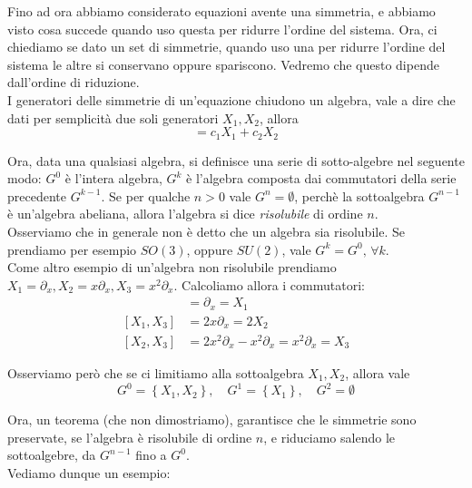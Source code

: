 \documentclass{report}
\begin{document}
Fino ad ora abbiamo considerato equazioni avente una simmetria, e abbiamo visto cosa succede quando uso questa per ridurre l'ordine del sistema. Ora, ci chiediamo se dato un set di simmetrie, quando uso una per ridurre l'ordine del sistema le altre si conservano oppure spariscono. Vedremo che questo dipende dall'ordine di riduzione. \\

I generatori delle simmetrie di un'equazione chiudono un algebra, vale a dire che dati per semplicità due soli generatori $X_1, X_2$, allora
\begin{equation}
    [X_1, X_2] = c_1X_1 + c_2 X_2
\end{equation}

Ora, data una qualsiasi algebra, si definisce una serie di sotto-algebre nel seguente modo: $G^{0}$ è l'intera algebra, $G^k$ è l'algebra composta dai commutatori della serie precedente $G^{k-1}$. Se per qualche $n>0$ vale $G^n = \emptyset$, perchè la sottoalgebra $G^{n-1}$ è un'algebra abeliana, allora l'algebra si dice \emph{risolubile} di ordine $n$. \\

Osserviamo che in generale non è detto che un algebra sia risolubile. Se prendiamo per esempio $SO(3)$, oppure $SU(2)$, vale $G^k = G^0, \, \forall k$. \\

Come altro esempio di un'algebra non risolubile prendiamo $X_1 = \partial_x, X_2 = x\partial_x, X_3 = x^2\partial_x$. Calcoliamo allora i commutatori: 
\begin{align}
    [X_1, X_2] &= \partial_x = X_1 \\ [X_1, X_3] &= 2x\partial_x = 2X_2 \\ [X_2, X_3] &= 2x^2\partial_x -x^2\partial_x = x^2\partial_x = X_3
\end{align}

Osserviamo però che se ci limitiamo alla sottoalgebra $X_1, X_2$, allora vale
\begin{equation}
    G^0 = \left\{X_1, X_2\right\}, \quad G^{1} = \left\{X_1\right\}, \quad G^2=\emptyset
\end{equation}

Ora, un teorema (che non dimostriamo), garantisce che le simmetrie sono preservate, se l'algebra è risolubile di ordine $n$, e riduciamo salendo le sottoalgebre, da $G^{n-1}$ fino a $G^0$. \\

Vediamo dunque un esempio: 
\end{document}
